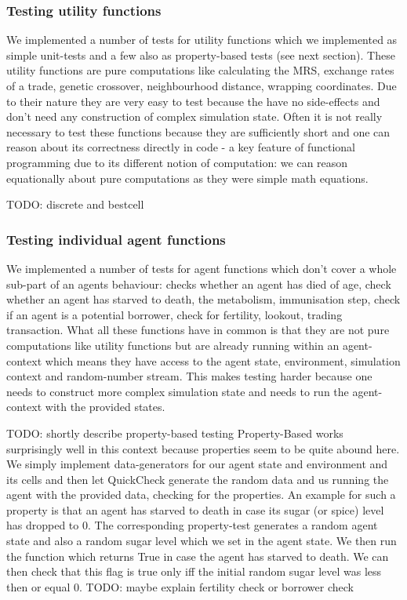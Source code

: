 \subsubsection{Testing utility functions}
We implemented a number of tests for utility functions which we implemented as simple unit-tests and a few also as property-based tests (see next section). These utility functions are pure computations like calculating the MRS, exchange rates of a trade, genetic crossover, neighbourhood distance, wrapping coordinates. Due to their nature they are very easy to test because the have no side-effects and don't need any construction of complex simulation state. Often it is not really necessary to test these functions because they are sufficiently short and one can reason about its correctness directly in code - a key feature of functional programming due to its different notion of computation: we can reason equationally about pure computations as they were simple math equations.

TODO: discrete and bestcell

\subsubsection{Testing individual agent functions}
We implemented a number of tests for agent functions which don't cover a whole sub-part of an agents behaviour: checks whether an agent has died of age, check whether an agent has starved to death, the metabolism, immunisation step, check if an agent is a potential borrower, check for fertility, lookout, trading transaction. What all these functions have in common is that they are not pure computations like utility functions but are already running within an agent-context which means they have access to the agent state, environment, simulation context and random-number stream. This makes testing harder because one needs to construct more complex simulation state and needs to run the agent-context with the provided states.

TODO: shortly describe property-based testing
Property-Based works surprisingly well in this context because properties seem to be quite abound here. We simply implement data-generators for our agent state and environment and its cells and then let QuickCheck generate the random data and us running the agent with the provided data, checking for the properties. An example for such a property is that an agent has starved to death in case its sugar (or spice) level has dropped to 0. The corresponding property-test generates a random agent state and also a random sugar level which we set in the agent state. We then run the function which returns True in case the agent has starved to death. We can then check that this flag is true only iff the initial random sugar level was less then or equal 0. TODO: maybe explain fertility check or borrower check

